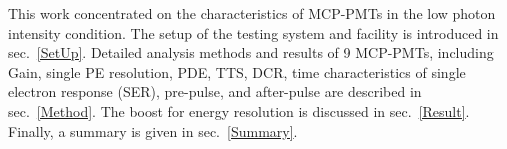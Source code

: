 This work concentrated on the characteristics of MCP-PMTs in the low photon intensity condition. The setup of the testing system and facility is introduced in sec.~\ref{SetUp}. Detailed analysis methods and results of 9 MCP-PMTs, including Gain, single PE resolution, PDE, TTS, DCR, time characteristics of single electron response (SER), pre-pulse, and after-pulse are described in sec.~\ref{Method}. The boost for energy resolution is discussed in sec.~\ref{Result}. Finally, a summary is given in sec.~\ref{Summary}.
